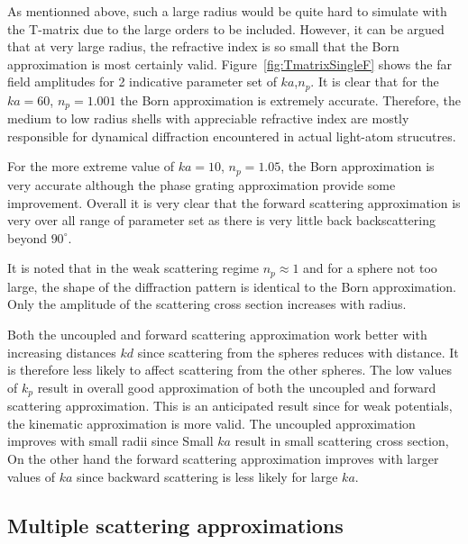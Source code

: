 As mentionned above, such a large radius would be quite hard to simulate with
the T-matrix due to the large orders to be included. However, it can be
argued that at very large radius, the refractive index is so small that the
Born approximation is most certainly valid.
Figure~\ref{fig:TmatrixSingleF} shows the far field amplitudes for 2
indicative parameter set of $ka$,$n_p$. It is clear that for the $ka=60$, $n_p=1.001$
the Born approximation is extremely accurate.
Therefore, the medium to low radius shells with appreciable refractive index are
mostly responsible for dynamical diffraction encountered in actual light-atom strucutres.

For the more extreme value of $ka=10$, $n_p=1.05$, the Born approximation is very
accurate although the phase grating approximation provide some improvement.
Overall it is very clear that the forward scattering approximation is very
over all range of parameter set as there is very little back backscattering
beyond $90^{\circ}$.


It is noted that in the weak scattering regime $n_p\approx 1$ and for a sphere
not too large, the shape of the diffraction pattern is identical to the Born
approximation.
Only the amplitude of the scattering cross section increases with radius.



Both the uncoupled and forward scattering approximation work better with increasing distances $kd$ since scattering from the spheres reduces with distance. It is therefore less likely to affect scattering from the other spheres.
The low values of $k_p$ result in overall good approximation of both the uncoupled and forward scattering approximation. This is an anticipated result since for weak potentials, the kinematic approximation is more valid.
The uncoupled approximation improves with small radii since Small $ka$ result in small scattering cross section,
On the other hand the forward scattering approximation improves with larger values of $ka$ since backward scattering is less likely for large $ka$.


\subsection{Multiple scattering approximations}




